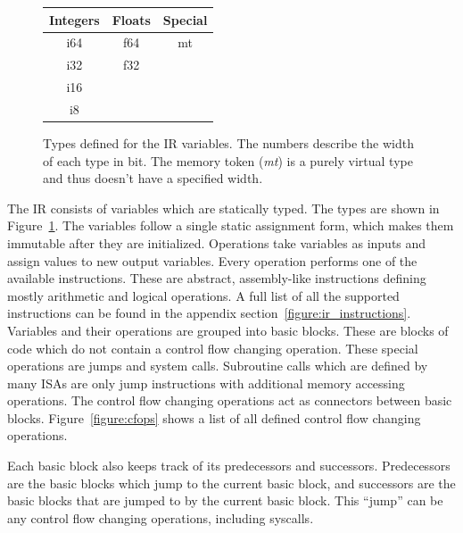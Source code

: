 \documentclass[course=eragp]{aspdoc}
\begin{document}
\begin{figure}[H]
    \begin{center}
        \begin{tabular}{|c | c | c|}
            \hline
            Integers & Floats & Special \\ [0.5ex]
            \hline\hline
            i64      & f64    & mt      \\
            \hline
            i32      & f32    &         \\
            \hline
            i16      &        &         \\
            \hline
            i8       &        &         \\
            \hline
        \end{tabular}
        \caption{Types defined for the IR variables. The numbers describe the width of each type in bit. The
            memory token (\textit{mt}) is a purely virtual type and thus doesn't have a specified width.}\label{ir:types:figure}
    \end{center}
\end{figure}


The IR consists of variables which are statically typed. The types are shown in
Figure~\ref{ir:types:figure}. The variables follow a single static assignment form, which makes them
immutable after they are initialized. Operations take variables as inputs and assign values to
new output variables. Every operation performs one of the available instructions. These are abstract,
assembly-like instructions defining mostly arithmetic and logical operations. A full list of all the
supported instructions can be found in the appendix section~\ref{figure:ir_instructions}.
Variables and their operations are grouped into basic blocks. These are blocks of code
which do not contain a control flow changing operation. These special operations are jumps and
system calls. Subroutine calls which are defined by many ISAs are only jump instructions with
additional memory accessing operations. The control flow changing operations act as connectors
between basic blocks. Figure~\ref{figure:cfops} shows a list of all defined control flow changing operations.

\par

Each basic block also keeps track of its predecessors and successors. Predecessors are the basic blocks which jump to
the current basic block, and successors are the basic blocks that are jumped to by the current basic
block. This ``jump'' can be any control flow changing operations, including syscalls.
\end{document}
